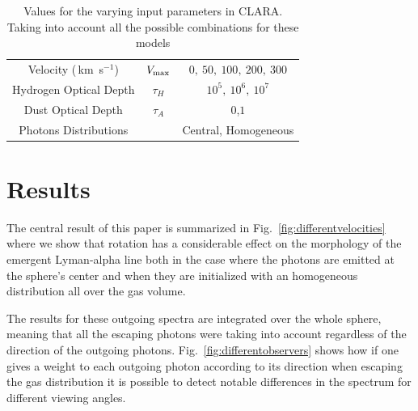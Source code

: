 \documentclass[usenatbib]{mn2e}
\newcommand{\kms}{\,km~s$^{-1}$}
\begin{document}
\begin{table}
\begin{center}
\begin{tabular}{ccc}\hline
Velocity (\kms) & $V_{\rm max}$&$0,\ 50,\ 100,\ 200,\ 300$\\
Hydrogen Optical Depth & $\tau_{H} $ & $10^{5},\ 10^{6},\ 10^{7}$\\
Dust Optical Depth & $\tau_{A}$ & $0$,$1$\\
Photons Distributions & & Central, Homogeneous\\
\hline
\end{tabular}
\caption{
Values for the varying input parameters in CLARA. Taking into account
all the possible combinations for these models
} 
\label{table:models}
\end{center}
\end{table}


\section{Results}
\label{sec:results}

The central result of this paper is summarized in
Fig.~\ref{fig:differentvelocities} where we show that rotation has a
considerable effect on the morphology of the emergent Lyman-alpha line
both in the case where the photons are emitted at the sphere's center
and when they are initialized with an homogeneous distribution all
over the gas volume.

The results for these outgoing spectra are integrated over the whole
sphere, meaning that all the escaping photons were taking into account
regardless of the direction of the outgoing photons. Fig.~\ref{fig:differentobservers}
shows how if one gives a weight to each outgoing
photon according to its direction when escaping the gas distribution
it is possible to detect notable differences in the spectrum for
different viewing angles.
\end{document}
